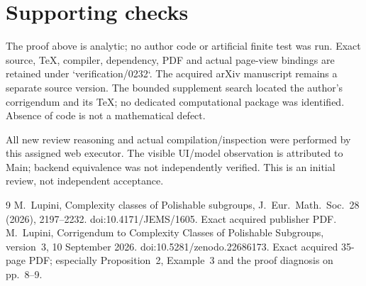 \documentclass[10pt]{article}
\begin{document}
\section*{Supporting checks}
The proof above is analytic; no author code or artificial finite test was run. Exact source, TeX, compiler, dependency, PDF and actual page-view bindings are retained under `verification/0232`. The acquired arXiv manuscript remains a separate source version. The bounded supplement search located the author’s corrigendum and its TeX; no dedicated computational package was identified. Absence of code is not a mathematical defect.\par
All new review reasoning and actual compilation/inspection were performed by this assigned web executor. The visible UI/model observation is attributed to Main; backend equivalence was not independently verified. This is an initial review, not independent acceptance.\par
9 M. Lupini, Complexity classes of Polishable subgroups, J. Eur. Math. Soc. 28 (2026), 2197–2232. doi:10.4171/JEMS/1605. Exact acquired publisher PDF. M. Lupini, Corrigendum to Complexity Classes of Polishable Subgroups, version 3, 10 September 2026. doi:10.5281/zenodo.22686173. Exact acquired 35-page PDF; especially Proposition 2, Example 3 and the proof diagnosis on pp. 8–9.\par
\end{document}
